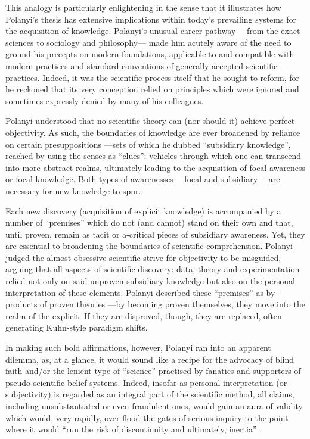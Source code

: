 This analogy is particularly enlightening in the sense that it illustrates how Polanyi's thesis has extensive implications within today's prevailing systems for the acquisition of knowledge. Polanyi's unusual career pathway ---from the exact sciences to sociology and philosophy--- made him acutely aware of the need to ground his precepts on modern foundations, applicable to and compatible with modern practices and standard conventions of generally accepted scientific practices. Indeed, it was the scientific process itself that he sought to reform, for he reckoned that its very conception relied on principles which were ignored and sometimes expressly denied by many of his colleagues. 

Polanyi understood that no scientific theory can (nor should it) achieve perfect objectivity. As such, the boundaries of knowledge are ever broadened by reliance on certain presuppositions ---sets of which he dubbed ``subsidiary knowledge'', reached by using the senses as ``clues'': vehicles through which one can transcend into more abstract realms, ultimately leading to the acquisition of focal awareness or focal knowledge. Both types of awarenesses ---focal and subsidiary--- are necessary for new knowledge to spur.

Each new discovery (acquisition of explicit knowledge) is accompanied by a number of ``premises'' which do not (and cannot) stand on their own and that, until proven, remain as tacit or a-critical pieces of subsidiary awareness. Yet, they are essential to broadening the boundaries of scientific comprehension. Polanyi judged the almost obsessive scientific strive for objectivity to be misguided, arguing that all aspects of scientific discovery: data, theory and experimentation relied not only on said unproven subsidiary knowledge but also on the personal interpretation of these elements. Polanyi described these ``premises'' as by-products of proven theories ---by becoming proven themselves, they move into the realm of the explicit. If they are disproved, though, they are replaced, often generating Kuhn-style paradigm shifts.

In making such bold affirmations, however, Polanyi ran into an apparent dilemma, as, at a glance, it would sound like a recipe for the advocacy of blind faith and/or the lenient type of ``science'' practised by fanatics and supporters of pseudo-scientific belief systems. Indeed, insofar as personal interpretation (or subjectivity) is regarded as an integral part of the scientific method, all claims, including unsubstantiated or even fraudulent ones, would gain an aura of validity which would, very rapidly, over-flood the gates of serious inquiry to the point where it would ``run the risk of discontinuity and ultimately, inertia'' \citep[p.37]{kane84}. 

